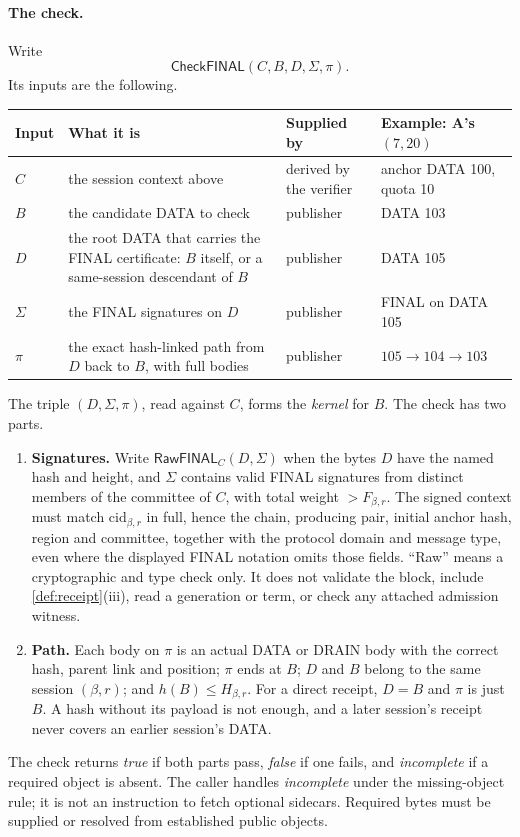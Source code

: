 \documentclass[11pt,a4paper]{article}
\newcommand{\tagg}[1]{\ensuremath{\mathsf{#1}}}
\newcommand{\defterm}[1]{\textcolor{rrBlue}{\textit{#1}}}
\newcounter{protocol}
\begin{document}
\paragraph{The check.}
Write
\[
 \tagg{CheckFINAL}(C,B,D,\Sigma,\pi).
\]
Its inputs are the following.
\begin{center}\small
\begin{tabularx}{\linewidth}{@{}>{\raggedright\arraybackslash}p{.05\linewidth}Y>{\raggedright\arraybackslash}p{.15\linewidth}>{\raggedright\arraybackslash}p{.22\linewidth}@{}}\toprule
Input & What it is & Supplied by & Example: A's $(7,20)$\\\midrule
$C$ & the session context above & derived by the verifier & anchor DATA 100, quota 10\\
$B$ & the candidate DATA to check & publisher & DATA 103\\
$D$ & the root DATA that carries the FINAL certificate: $B$ itself, or a same-session descendant of $B$ & publisher & DATA 105\\
$\Sigma$ & the FINAL signatures on $D$ & publisher & FINAL on DATA 105\\
$\pi$ & the exact hash-linked path from $D$ back to $B$, with full bodies & publisher & $105\to104\to103$\\\bottomrule
\end{tabularx}
\end{center}
The triple $(D,\Sigma,\pi)$, read against $C$, forms the \defterm{kernel} for $B$.
The check has two parts.
\begin{enumerate}[label=(\arabic*),itemsep=2pt]
\item \textbf{Signatures.} Write $\tagg{RawFINAL}_C(D,\Sigma)$ when the
bytes $D$ have the named hash and height, and $\Sigma$ contains valid
FINAL signatures from distinct members of the committee of $C$, with total
weight $>F_{\beta,r}$. The signed context must match $\mathrm{cid}_{\beta,r}$
in full, hence the chain, producing pair, initial anchor hash, region and
committee, together with the protocol domain and message type, even where
the displayed FINAL notation omits those fields. ``Raw'' means a cryptographic and type check only. It does not
validate the block, include \cref{def:receipt}(iii), read a generation
or term, or check any attached admission witness.
\item \textbf{Path.} Each body on $\pi$ is an actual DATA or DRAIN body
with the correct hash, parent link and position; $\pi$ ends at $B$; $D$
and $B$ belong to the same session $(\beta,r)$; and
$h(B)\le H_{\beta,r}$. For a direct receipt, $D=B$ and $\pi$ is just $B$.
A hash without its payload is not enough, and a later session's receipt
never covers an earlier session's DATA.
\end{enumerate}
The check returns \emph{true} if both parts pass, \emph{false} if one
fails, and \emph{incomplete} if a required object is absent. The caller
handles \emph{incomplete} under the missing-object rule; it is not an
instruction to fetch optional sidecars. Required bytes must be supplied
or resolved from established public objects.
\end{document}
